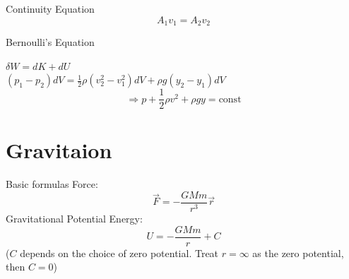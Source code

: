 \documentclass{beamer}
\begin{document}
\begin{frame}
  \begin{block}{Continuity Equation}
    $$A_1 v_1 = A_2 v_2$$
  \end{block}
  \begin{block}{Bernoulli's Equation}
    \begin{centering}
    $\delta W = dK + dU$\\
    $(p_1-p_2)dV = \frac{1}{2}\rho (v_2^2 - v_1^2)dV + \rho g(y_2-y_1)dV$\\
    $$\Rightarrow p + \frac{1}{2}\rho v^2 + \rho gy = \text{const}$$
    \end{centering}
  \end{block}
\end{frame}

\section{Gravitaion}
\begin{frame}
  \begin{block}{Basic formulas}
    Force: $$\vec{F}= -\frac{GMm}{r^3}\vec{r}$$
    Gravitational Potential Energy:
    $$U = -\frac{GMm}{r} + C$$
    ($C$ depends on the choice of zero potential. Treat $r = \infty$ as the zero potential, then $C = 0$)
  \end{block}
\end{frame}
\end{document}
